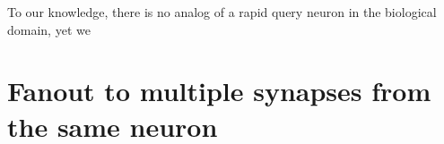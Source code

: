 \documentclass[twocolumn]{article}
\begin{document}
\begin{figure} 
\end{figure}

To our knowledge, there is no analog of a rapid query neuron in the biological domain, yet we 

\section{\label{sec:fluxonic_fanout}Fanout to multiple synapses from the same neuron}
\end{document}

